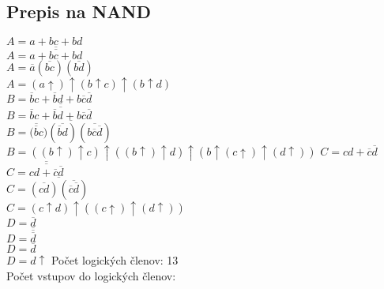 \documentclass{article}
\begin{document}
\subsection{Prepis na NAND}
$A = a + bc + bd$\\
$A = \overline{\overline{a + bc + bd}}$\\
$A = \overline{a}(\overline{bc})(\overline{bd})$\\
$A = (a\uparrow)\uparrow(b\uparrow c)\uparrow(b\uparrow d)$\\
$B = \overline{b}c + \overline{b}d + b\overline{c}\overline{d}$\\
$B = \overline{\overline{\overline{b}c + \overline{b}d + b\overline{c}\overline{d}}}$\\
$B = \overline{\overline{(\overline{b}c})(\overline{\overline{b}d})(\overline{b\overline{c}\overline{d}})}$\\
$B = ((b\uparrow)\uparrow c)\uparrow((b\uparrow)\uparrow d)\uparrow(b\uparrow(c\uparrow)\uparrow(d\uparrow))$
$C = cd + \overline{c}\overline{d}$\\
$C = \overline{\overline{cd + \overline{c}\overline{d}}}$\\
$C = \overline{(\overline{cd})(\overline{\overline{c}\overline{d}})}$\\
$C = (c \uparrow d)\uparrow((c\uparrow)\uparrow(d\uparrow))$\\
$D = \overline{d}$\\
$D = \overline{\overline{\overline{d}}}$\\
$D = \overline{d}$\\
$D = d\uparrow$
Počet logických členov: 13\\
Počet vstupov do logických členov:
\end{document}
